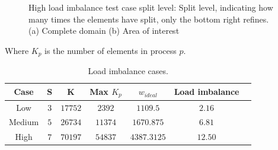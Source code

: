 \begin{figure}[H]
	\centering
	\hfill
	\caption{High load imbalance test case split level: Split level, indicating how many times the elements have split, only the bottom right refines. (a) Complete domain (b) Area of interest}\label{fig:load_imbalance_case_high_s}
\end{figure}

Where \(K_p\) is the number of elements in process \(p\).

\begin{table}[H]
	\centering
	\begin{tabular}{ c c c c c c c }
		Case & S & K & Max \(K_p\) & \(w_{ideal}\) & Load imbalance \\
		\midrule
		Low & \(3\) & \(17752\) & \(2392\) & \(1109.5\) & \(2.16\) \\
		Medium & \(5\) & \(26734\) & \(11374\) & \(1670.875\) & \(6.81\) \\
		High & \(7\) & \(70197\) & \(54837\) & \(4387.3125\) & \(12.50\) \\
	\end{tabular}
	\caption{Load imbalance cases.}\label{table:load_imbalance}
\end{table}


